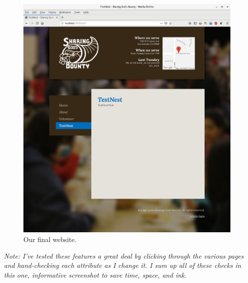 \begin{figure}[h]
  \centering
  \includegraphics[width=\linewidth]{site.png}
  \caption{Our final website.}
  \label{fig:site}
\end{figure}

\emph{Note: I've tested these features a great deal by clicking through the various pages and hand-checking each attribute as I change it. I sum up all of these checks in this one, informative screenshot to save time, space, and ink.}

\clearpage
